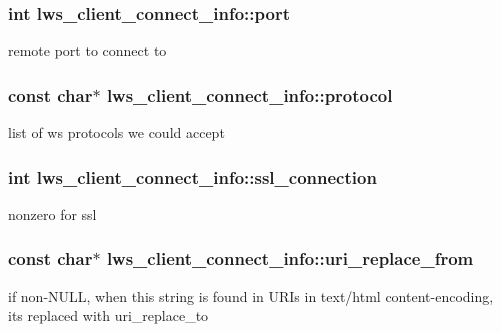 \subsubsection[{\texorpdfstring{port}{port}}]{\setlength{\rightskip}{0pt plus 5cm}int lws\+\_\+client\+\_\+connect\+\_\+info\+::port}\hypertarget{structlws__client__connect__info_a1af124d81c3c22a46d39387c5bc3d6b9}{}\label{structlws__client__connect__info_a1af124d81c3c22a46d39387c5bc3d6b9}
remote port to connect to 
\subsubsection[{\texorpdfstring{protocol}{protocol}}]{\setlength{\rightskip}{0pt plus 5cm}const char$\ast$ lws\+\_\+client\+\_\+connect\+\_\+info\+::protocol}\hypertarget{structlws__client__connect__info_aba35adfb74845a5fd0c3dc141cbdddd2}{}\label{structlws__client__connect__info_aba35adfb74845a5fd0c3dc141cbdddd2}
list of ws protocols we could accept 
\subsubsection[{\texorpdfstring{ssl\+\_\+connection}{ssl\_connection}}]{\setlength{\rightskip}{0pt plus 5cm}int lws\+\_\+client\+\_\+connect\+\_\+info\+::ssl\+\_\+connection}\hypertarget{structlws__client__connect__info_a9862297827639238a7a0b4054c3ddf3d}{}\label{structlws__client__connect__info_a9862297827639238a7a0b4054c3ddf3d}
nonzero for ssl 
\subsubsection[{\texorpdfstring{uri\+\_\+replace\+\_\+from}{uri\_replace\_from}}]{\setlength{\rightskip}{0pt plus 5cm}const char$\ast$ lws\+\_\+client\+\_\+connect\+\_\+info\+::uri\+\_\+replace\+\_\+from}\hypertarget{structlws__client__connect__info_a03c305fdca809667b6a9a83b3edfd83a}{}\label{structlws__client__connect__info_a03c305fdca809667b6a9a83b3edfd83a}
if non-\/\+N\+U\+LL, when this string is found in U\+R\+Is in text/html content-\/encoding, it\textquotesingle{}s replaced with uri\+\_\+replace\+\_\+to 
